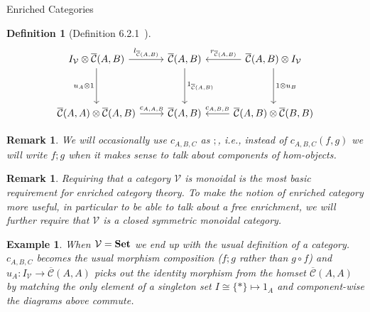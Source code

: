 \documentclass[acmsmall, screen, nonacm]{acmart}
\newtheorem{definition}[theorem]{Definition}
\newtheorem{example}[theorem]{Example}
\newtheorem{remark}[theorem]{Remark}
\newcommand\enriched[1]{{\overline{\mathcal{#1}}}}
\begin{document}
\begin{section}{Enriched Categories}
\begin{definition}[Definition 6.2.1~\cite{Borceux_1994}]
  \[
  \begin{tikzcd}
    {I_{\mathcal{V}} \otimes \enriched{C}(A,B)} \arrow[dd, "u_{A} \otimes 1"'] \arrow[r, "{l_{\enriched{C}(A,B)}}"]                                             & {\enriched{C}(A,B)} \arrow[dd, "{1_{\enriched{C}(A,B)}}"] & {\enriched{C}(A,B) \otimes I_{\mathcal{V}}} \arrow[l, "{r_{\enriched{C}(A,B)}}"'] \arrow[dd, "1 \otimes u_{B}"]                                                           \\
    &                                     &                                                                                                                                       \\
{\enriched{C}(A,A) \otimes \enriched{C}(A,B)} \arrow[r, "{c_{A,A,B}}"]                                                                        & {\enriched{C}(A,B)}                            & {\enriched{C}(A,B) \otimes \enriched{C}(B,B)} \arrow[l, "{c_{A,B,B}}"']                                                                                    
\end{tikzcd}
  \]
\end{definition}

\begin{remark}
  We will occasionally use $c_{A,B,C}$ as $;$, \textit{i.e.}, instead of $c_{A,B,C}(f,g)$ we will write $f ; g$ when it makes sense to talk about components of hom-objects.
\end{remark}

\begin{remark}

Requiring that a category $\mathcal{V}$ is monoidal is the most basic requirement for enriched category theory.
To make the notion of enriched category more useful, in particular to be able to talk about a free enrichment, we will further require that $\mathcal{V}$ is a closed symmetric monoidal category.
\end{remark}

\begin{example}
When $\mathcal{V} = \mathbf{Set}$ we end up with the usual definition of a category.
$c_{A,B,C}$ becomes the usual morphism composition ($f;g$ rather than $g \circ f$) and $u_{A} : I_{\mathcal{V}} \to \enriched{C}(A,A)$ picks out the identity morphism from the homset $\enriched{C}(A,A)$ by matching the only element of a singleton set $I \cong \{*\} \mapsto 1_{A}$ and component-wise the diagrams above commute.
\end{example}


\end{section}
\end{document}
